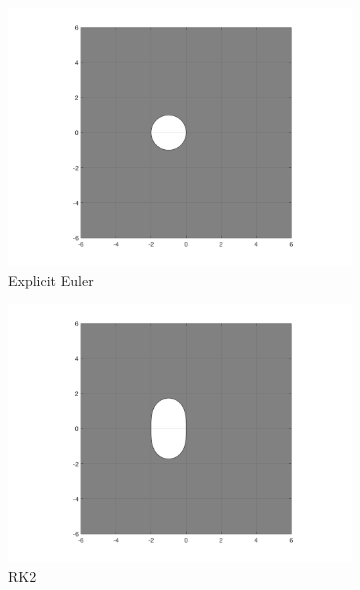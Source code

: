 \documentclass[10pt]{report}
\begin{document}
\begin{enumerate}
	\begin{figure}[ht]
		\vspace{-2ex}
		\begin{subfigure}[b]{0.25\linewidth}
			\centering
			\includegraphics[width=\linewidth]{EE.png}
			\vspace{-5ex} 
			\caption*{Explicit Euler}
		\end{subfigure}%
		\begin{subfigure}[b]{0.25\linewidth}
			\centering
			\includegraphics[width=\linewidth]{RK2.png} 
			\vspace{-5ex}
			\caption*{RK2}
		\end{subfigure}%
		\begin{subfigure}[b]{0.25\linewidth}

\end{subfigure}
\end{figure}
\end{enumerate}
\end{document}
